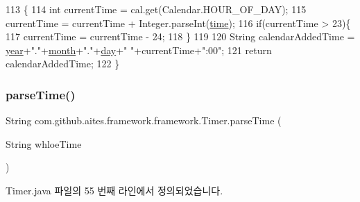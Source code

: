 \begin{DoxyCode}
113                                                   \{
114         \textcolor{keywordtype}{int} currentTime = cal.get(Calendar.HOUR\_OF\_DAY);
115         currentTime = currentTime + Integer.parseInt(\mbox{\hyperlink{classcom_1_1github_1_1aites_1_1framework_1_1framework_1_1_timer_a04901e0f7fd1f7024218cba52d7a8b26}{time}});
116         \textcolor{keywordflow}{if}(currentTime > 23)\{
117             currentTime = currentTime - 24;
118         \}
119         
120         String calendarAddedTime = \mbox{\hyperlink{classcom_1_1github_1_1aites_1_1framework_1_1framework_1_1_timer_aa8703c39746c1952e9e969472d3beca4}{year}}+\textcolor{stringliteral}{"."}+\mbox{\hyperlink{classcom_1_1github_1_1aites_1_1framework_1_1framework_1_1_timer_a787e26630dfa348baa4e02172128ea3a}{month}}+\textcolor{stringliteral}{"."}+\mbox{\hyperlink{classcom_1_1github_1_1aites_1_1framework_1_1framework_1_1_timer_a875396d63f45c8cd4db75f3b85ac398d}{day}}+\textcolor{stringliteral}{" "}+currentTime+\textcolor{stringliteral}{":00"};
121         \textcolor{keywordflow}{return} calendarAddedTime;
122     \}
\end{DoxyCode}
\mbox{\label{classcom_1_1github_1_1aites_1_1framework_1_1framework_1_1_timer_a4923726c56eab4c2efc2d3f66b0c8cd1}} 
\subsubsection{\texorpdfstring{parse\+Time()}{parseTime()}}
{\footnotesize\ttfamily String com.\+github.\+aites.\+framework.\+framework.\+Timer.\+parse\+Time (\begin{DoxyParamCaption}\item[{String}]{whloe\+Time }\end{DoxyParamCaption})}



Timer.\+java 파일의 55 번째 라인에서 정의되었습니다.


